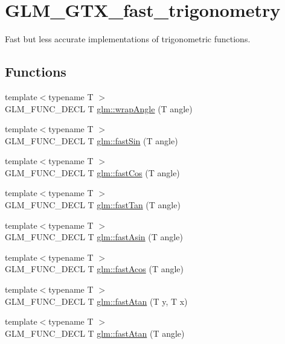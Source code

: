 \hypertarget{group__gtx__fast__trigonometry}{\section{G\-L\-M\-\_\-\-G\-T\-X\-\_\-fast\-\_\-trigonometry}
\label{group__gtx__fast__trigonometry}
}


Fast but less accurate implementations of trigonometric functions.  


\subsection*{Functions}
\begin{DoxyCompactItemize}
\item 
{\footnotesize template$<$typename T $>$ }\\G\-L\-M\-\_\-\-F\-U\-N\-C\-\_\-\-D\-E\-C\-L T \hyperlink{group__gtx__fast__trigonometry_ga069527c6dbd64f53435b8ebc4878b473}{glm\-::wrap\-Angle} (T angle)
\item 
{\footnotesize template$<$typename T $>$ }\\G\-L\-M\-\_\-\-F\-U\-N\-C\-\_\-\-D\-E\-C\-L T \hyperlink{group__gtx__fast__trigonometry_ga0aab3257bb3b628d10a1e0483e2c6915}{glm\-::fast\-Sin} (T angle)
\item 
{\footnotesize template$<$typename T $>$ }\\G\-L\-M\-\_\-\-F\-U\-N\-C\-\_\-\-D\-E\-C\-L T \hyperlink{group__gtx__fast__trigonometry_gab34c8b45c23c0165a64dcecfcc3b302a}{glm\-::fast\-Cos} (T angle)
\item 
{\footnotesize template$<$typename T $>$ }\\G\-L\-M\-\_\-\-F\-U\-N\-C\-\_\-\-D\-E\-C\-L T \hyperlink{group__gtx__fast__trigonometry_gaf29b9c1101a10007b4f79ee89df27ba2}{glm\-::fast\-Tan} (T angle)
\item 
{\footnotesize template$<$typename T $>$ }\\G\-L\-M\-\_\-\-F\-U\-N\-C\-\_\-\-D\-E\-C\-L T \hyperlink{group__gtx__fast__trigonometry_ga562cb62c51fbfe7fac7db0bce706b81f}{glm\-::fast\-Asin} (T angle)
\item 
{\footnotesize template$<$typename T $>$ }\\G\-L\-M\-\_\-\-F\-U\-N\-C\-\_\-\-D\-E\-C\-L T \hyperlink{group__gtx__fast__trigonometry_ga9721d63356e5d94fdc4b393a426ab26b}{glm\-::fast\-Acos} (T angle)
\item 
{\footnotesize template$<$typename T $>$ }\\G\-L\-M\-\_\-\-F\-U\-N\-C\-\_\-\-D\-E\-C\-L T \hyperlink{group__gtx__fast__trigonometry_ga8d197c6ef564f5e5d59af3b3f8adcc2c}{glm\-::fast\-Atan} (T y, T x)
\item 
{\footnotesize template$<$typename T $>$ }\\G\-L\-M\-\_\-\-F\-U\-N\-C\-\_\-\-D\-E\-C\-L T \hyperlink{group__gtx__fast__trigonometry_gae25de86a968490ff56856fa425ec9d30}{glm\-::fast\-Atan} (T angle)
\end{DoxyCompactItemize}


